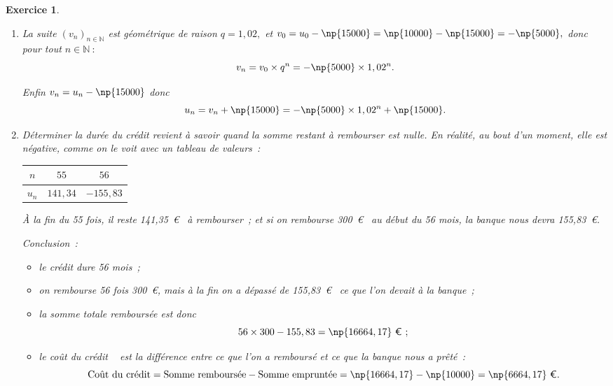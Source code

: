 \documentclass[10pt]{article}
\newtheorem{exo}{Exercice}
\begin{document}
\begin{exo}
\begin{enumerate}
Conclusion~: pour tout $n\in\mathbb{N},$ $v_{n+1}=1,02v_n,$
donc $(v_n)_{n\in\mathbb{N}}$ est géométrique de raison $q=1,02.$


\item La suite $(v_n)_{n\in\mathbb{N}}$ est géométrique de raison $q=1,02,$ et  $v_0=u_0-\np{15000}=\np{10000}-\np{15000}=-\np{5000},$ donc pour tout $n\in\mathbb{N}~:$
\[v_n=v_0\times q^n=-\np{5000}\times 1,02^n.\]

Enfin $v_n=u_n-\np{15000}$ donc
\[u_n=v_n+\np{15000}=-\np{5000}\times 1,02^n+\np{15000}.\]
\item Déterminer la durée du crédit revient à savoir quand la somme restant à rembourser est nulle. En réalité, au bout d'un moment, elle est négative, comme on le voit avec un tableau de valeurs~:

\medskip

\begin{center}
\begin{tabular}{|c|c|c|}\hline
	$n$&$55$&$56$	\\ \hline   
$u_n$&$141,34$&$-155,83$ \\ \hline    
\end{tabular}
\end{center}

\medskip

\`A la fin du 55 fois, il reste 141,35~\euro~{} à rembourser~; et si on rembourse 300~\euro~{} au début du 56 mois, la banque nous devra 155,83~\euro.


Conclusion~:

\begin{itemize}
\item[\textbullet] le crédit dure 56 mois~;
\item[\textbullet] on rembourse 56 fois 300~\euro, mais à la fin on a dépassé de 155,83~\euro~{} ce que l'on devait à la banque~;
\item[\textbullet] la somme totale remboursée est donc
\[56\times 300-155,83=\np{16664,17}~\text{\euro}~;\]
\item[\textbullet] le \og coût du crédit \fg~{} est la différence entre ce que l'on a remboursé et ce que la banque nous a prêté~:
\[\text{Coût du crédit}=\text{Somme remboursée}-\text{Somme empruntée}=
\np{16664,17}-\np{10000}=\np{6664,17}~\text{\euro}.\]
\end{itemize}

\end{enumerate}


\end{exo}
\end{document}
